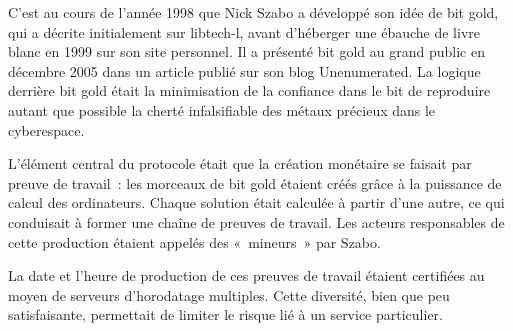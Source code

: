 C'est au cours de l'année 1998 que Nick Szabo a développé son idée de bit gold, qui a décrite initialement sur libtech-l, avant d'héberger une ébauche de livre blanc en 1999 sur son site personnel. Il a présenté bit gold au grand public en décembre 2005 dans un article publié sur son blog Unenumerated. La logique derrière bit gold était la minimisation de la confiance dans le bit de reproduire autant que possible la cherté infalsifiable des métaux précieux dans le cyberespace.

L'élément central du protocole était que la création monétaire se faisait par preuve de travail~: les morceaux de bit gold étaient créés grâce à la puissance de calcul des ordinateurs. Chaque solution était calculée à partir d'une autre, ce qui conduisait à former une chaîne de preuves de travail. Les acteurs responsables de cette production étaient appelés des «~mineurs~» par Szabo.


La date et l'heure de production de ces preuves de travail étaient certifiées au moyen de serveurs d'horodatage multiples. Cette diversité, bien que peu satisfaisante, permettait de limiter le risque lié à un service particulier.

